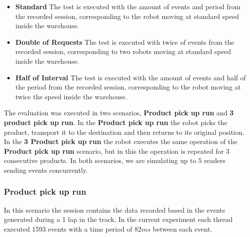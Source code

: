 \begin{itemize}
  \item\textbf{Standard} The test is executed with the amount of events and period from the recorded
  session, corresponding to the robot moving at standard speed inside the warehouse.
  \item\textbf{Double of Requests} The test is executed with twice of events from the recorded session,
  corresponding to two robots moving at standard speed inside the warehouse.
  \item\textbf{Half of Interval} The test is executed with the amount of events and half of the period from
  the recorded session, corresponding to the robot moving at twice the speed inside the warehouse.
\end{itemize}

The evaluation was executed in two scenarios, \textbf{Product pick up run} and \textbf{3 product pick up run}.
In the \textbf{Product pick up run} the robot picks the product, transport it to the destination
and then returns to its original position. In the \textbf{3 Product pick up run} the robot executes
the same operation of the \textbf{Product pick up run} scenario, but in this the operation is repeated
for 3 consecutive products. In both scenarios, we are simulating up to 5 readers sending events
concurrently.

\subsubsection{Product pick up run}
\label{subs:eval_exp_data_baseline}
In this scenario the session contains the data recorded based in the events generated during a 1 lap
in the track. In the current experiment each thread executed 1593 events with a time period of 82$ms$
between each event.\\

